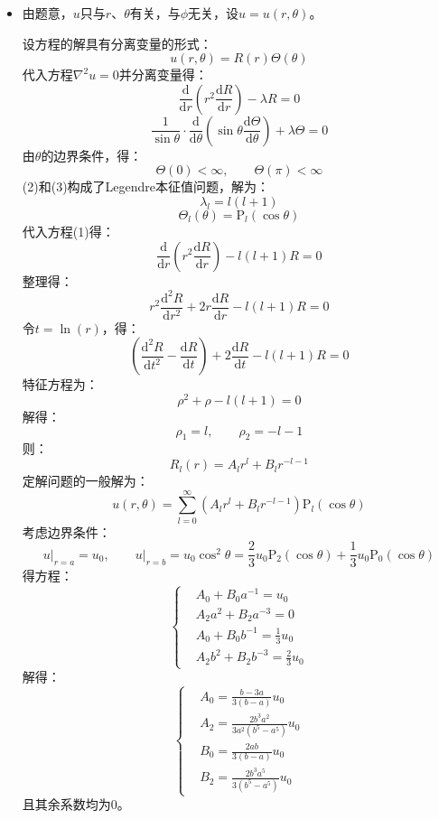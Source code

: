 \documentclass[fontset=windows]{ctexart}
\begin{document}
\begin{itemize}
    \item[5.]
    由题意，$u$只与$r$、$\theta$有关，与$\phi$无关，设$u=u(r,\theta)$。

    设方程的解具有分离变量的形式：
    \[
    u(r,\theta) = R(r)\varTheta(\theta)
    \]
    代入方程$\nabla^2 u=0$并分离变量得：
    \[
    \frac{\mathrm{d}}{\mathrm{d}r}\left(r^2\frac{\mathrm{d}R}{\mathrm{d}r}\right) - \lambda R = 0 \tag{1}
    \]
    \[
    \frac{1}{\sin\theta}\cdot\frac{\mathrm{d}}{\mathrm{d}\theta}\left(\sin\theta\frac{\mathrm{d}\varTheta}{\mathrm{d}\theta}\right) + \lambda\varTheta = 0 \tag{2}
    \]
    由$\theta$的边界条件，得：
    \[
    \varTheta(0)<\infty,\qquad \varTheta(\pi)<\infty \tag{3}
    \]
    (2)和(3)构成了Legendre本征值问题，解为：
    \[
    \lambda_l = l(l+1)
    \]
    \[
    \varTheta_l(\theta) = \mathrm{P}_l(\cos\theta)
    \]
    代入方程(1)得：
    \[
    \frac{\mathrm{d}}{\mathrm{d}r}\left(r^2\frac{\mathrm{d}R}{\mathrm{d}r}\right) - l(l+1)R = 0 \tag{4}
    \]
    整理得：
    \[
    r^2\frac{\mathrm{d}^2 R}{\mathrm{d}r^2} + 2r\frac{\mathrm{d}R}{\mathrm{d}r} - l(l+1)R = 0
    \]
    令$t = \ln(r)$，得：
    \[
    \left(\frac{\mathrm{d}^2 R}{\mathrm{d}t^2} - \frac{\mathrm{d}R}{\mathrm{d}t}\right) + 2\frac{\mathrm{d}R}{\mathrm{d}t} - l(l+1)R = 0
    \]
    特征方程为：
    \[
    \rho^2 + \rho - l(l+1) = 0
    \]
    解得：
    \[
    \rho_1 = l,\qquad \rho_2 = -l-1
    \]
    则：
    \[
    R_l(r) = A_lr^l + B_lr^{-l-1}
    \]
    定解问题的一般解为：
    \[
    u(r,\theta) = \sum_{l=0}^{\infty}(A_lr^l + B_lr^{-l-1})\mathrm{P}_l(\cos\theta)
    \]
    考虑边界条件：
    \[
    \left.u\right|_{r=a} = u_0,\qquad \left.u\right|_{r=b} = u_0\cos^2\theta = \frac{2}{3}u_0 \mathrm{P}_2(\cos\theta)+\frac{1}{3}u_0 \mathrm{P}_0(\cos\theta)
    \]
    得方程：
    \[
    \left\{
    \begin{aligned}
        & A_0 + B_0 a^{-1} = u_0 \\
        & A_2 a^2 + B_2 a^{-3} = 0 \\
        & A_0 + B_0 b^{-1} = \frac{1}{3}u_0 \\
        & A_2 b^2 + B_2 b^{-3} = \frac{2}{3}u_0
    \end{aligned}
    \right.
    \]
    解得：
    \[
    \left\{
    \begin{aligned}
        & A_0 = \frac{b-3a}{3(b-a)}u_0 \\
        & A_2 = \frac{2b^3 a^2}{3a^2(b^5-a^5)}u_0 \\
        & B_0 = \frac{2ab}{3(b-a)}u_0 \\
        & B_2 = \frac{2b^3 a^5}{3(b^5-a^5)}u_0
    \end{aligned}
    \right.
    \]
    且其余系数均为0。


\end{itemize}
\end{document}
